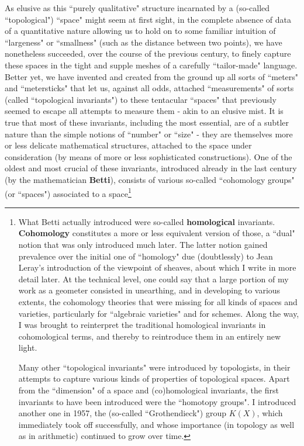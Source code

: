 As elusive as this ``purely qualitative" structure incarnated by a (so-called ``topological") ``space" might seem at first sight, in the complete absence of data of a quantitative nature allowing us to hold on to some familiar intuition of ``largeness" or ``smallness" (such as the distance between two points), we have nonetheless succeeded, over the course of the previous century, to finely capture these spaces in the tight and supple meshes of a carefully ``tailor-made" language. Better yet, we have invented and created from the ground up all sorts of ``meters" and ``metersticks" that let us, against all odds, attached ``measurements" of sorts (called ``topological invariants") to these tentacular ``spaces" that previously seemed to escape all attempts to measure them - akin to an elusive mist. It is true that most of these invariants, including the most essential, are of a subtler nature than the simple notions of ``number" or ``size" - they are themselves more or less delicate mathematical structures, attached to the space under consideration (by means of more or less sophisticated constructions). One of the oldest and most crucial of these invariants, introduced already in the last century (by the mathematician \textbf{Betti}), consists of various so-called ``cohomology groups" (or ``spaces") associated to a space\footnote{What Betti actually introduced were so-called \textbf{homological} invariants. \textbf{Cohomology} constitutes a more or less equivalent version of those, a ``dual" notion that was only introduced much later. The latter notion gained prevalence over the initial one of ``homology" due (doubtlessly) to Jean Leray's introduction of the viewpoint of sheaves, about which I write in more detail later. At the technical level, one could say that a large portion of my work as a geometer consisted in unearthing, and in developing to various extents, the cohomology theories that were missing for all kinds of spaces and varieties, particularly for ``algebraic varieties" and for schemes. Along the way, I was brought to reinterpret the traditional homological invariants in cohomological terms, and thereby to reintroduce them in an entirely new light.

Many other ``topological invariants" were introduced by topologists, in their attempts to capture various kinds of properties of topological spaces. Apart from the ``dimension" of a space and (co)homological invariants, the first invariants to have been introduced were the ``homotopy groups". I introduced another one in 1957, the (so-called ``Grothendieck") group $K(X)$, which immediately took off successfully, and whose importance (in topology as well as in arithmetic) continued to grow over time. 

}
